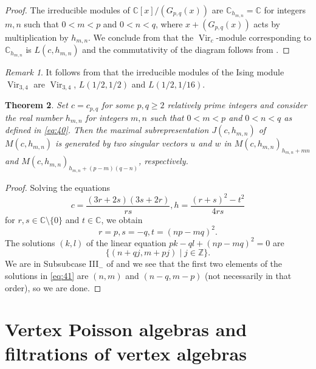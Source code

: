 \documentclass[a4paper, 12pt, reqno]{amsart}
\newtheorem{theorem}{Theorem}[section]
\theoremstyle{remark}
\newtheorem{remark}[theorem]{Remark}
\numberwithin{equation}{subsection}
\DeclareMathOperator{\Vir}{Vir}
\begin{document}
\begin{proof}
  The irreducible modules of $\mathbb{C}[x]/(G_{p, q}(x))$ are $\mathbb{C}_{h_{m, n}} = \mathbb{C}$ for integers $m, n$ such that $0 < m < p$ and $0 < n < q$, where $x + (G_{p, q}(x))$ acts by multiplication by $h_{m, n}$.
  We conclude from  that the $\Vir_c$-module corresponding to $\mathbb{C}_{h_{m, n}}$ is $L(c, h_{m, n})$ and the commutativity of the diagram follows from .
\end{proof}

\begin{remark}
  \label{rmk:29}
  It follows from  that the irreducible modules of the Ising module $\Vir_{3, 4}$ are $\Vir_{3, 4}$, $L(1/2, 1/2)$ and $L(1/2, 1/16)$.
\end{remark}

\begin{theorem}
  \label{thr:43}
  Set $c = c_{p, q}$ for some $p, q \ge 2$ relatively prime integers and consider the real number $h_{m, n}$ for integers $m, n$ such that $0 < m < p$ and $0 < n < q$ as defined in \eqref{eq:40}.
  Then the maximal subrepresentation $J(c, h_{m, n})$ of $M(c, h_{m, n})$ is generated by two singular vectors $u$ and $w$ in $M(c, h_{m, n})_{h_{m, n} + mn}$ and $M(c, h_{m, n})_{h_{m, n} + (p - m)(q - n)}$, respectively.
\end{theorem}

\begin{proof}
  Solving the equations 
  \begin{equation*}
    c = \frac{(3r + 2s)(3s + 2r)}{rs}, h = \frac{(r + s)^2 - t^2}{4rs}
  \end{equation*}
  for $r, s \in \mathbb{C}\setminus\{0\}$ and $t \in \mathbb{C}$, we obtain
  \begin{equation*}
    r = p, s = -q, t = (np - mq)^2.
  \end{equation*}
  The solutions $(k, l)$ of the linear equation $pk - ql + (np - mq)^2 = 0$ are
  \begin{equation}
    \label{eq:41}
    \{(n + qj, m + pj) \mid j \in \mathbb{Z}\}.
  \end{equation}
  We are in Subsubcase III$_-$ of  and we see that the first two elements of the solutions in \eqref{eq:41} are $(n, m)$ and $(n - q, m - p)$ (not necessarily in that order), so we are done.
\end{proof}

\section{Vertex Poisson algebras and filtrations of vertex algebras}
\label{sec:vert-poiss-algebr}
\end{document}
